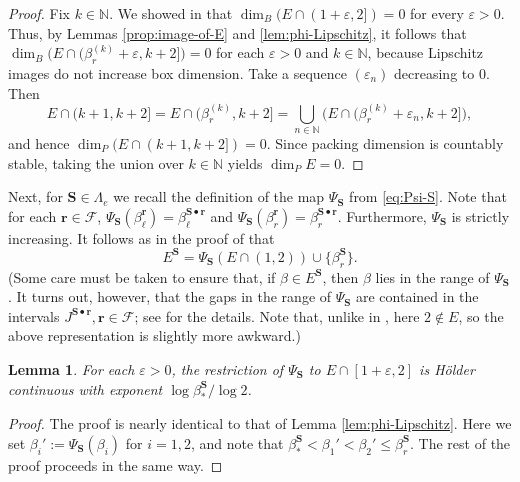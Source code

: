 \documentclass[12pt]{amsart}
\newtheorem{lemma}[theorem]{Lemma}
\theoremstyle{definition}
\theoremstyle{remark}
\numberwithin{equation}{section}
\newcommand{\N}{\ensuremath{\mathbb{N}}}
\newcommand{\cF}{\mathcal{F}}
\newcommand{\cs}{ {\mathbf{S}}}
\renewcommand{\r}{ {\mathbf{r}}}
\newcommand{\ep}{\varepsilon}
\newcommand{\al}{\alpha}
\newcommand{\La}{\Lambda}
\begin{document}
{\begin{proof}
Fix $k\in\N$. We showed in \cite{Allaart-Kong-2021} that $\dim_B(E\cap(1+\ep,2])=0$ for every $\ep>0$. Thus, by Lemmas \ref{prop:image-of-E} and \ref{lem:phi-Lipschitz}, it follows that $\dim_B\big(E\cap(\beta_r^{(k)}+\ep,k+2]\big)=0$ for each $\ep>0$ and $k\in\N$, because Lipschitz images do not increase box dimension. Take a sequence $(\ep_n)$ decreasing to $0$. Then 
\[
E\cap(k+1,k+2]=E\cap(\beta_r^{(k)},k+2]=\bigcup_{n\in\N} \big(E\cap(\beta_r^{(k)}+\ep_n,k+2]\big),
\]
and hence $\dim_P(E\cap(k+1,k+2])=0$. Since packing dimension is countably stable, taking the union over $k\in\N$ yields $\dim_P E=0$.
\end{proof}

Next, for $\cs\in\La_e$ we recall the definition of the map $\Psi_\cs$ from \eqref{eq:Psi-S}.
Note that for each $\r\in\cF$, $\Psi_\cs(\beta_\ell^\r)=\beta_\ell^{\cs\bullet\r}$ and $\Psi_\cs(\beta_r^\r)=\beta_r^{\cs\bullet\r}$. Furthermore, $\Psi_\cs$ is strictly increasing. It follows as in the proof of \cite[Proposition 5.4]{Allaart-Kong-2021} that
\begin{equation} \label{eq:E-transformation}
E^\cs=\Psi_\cs(E\cap(1,2))\cup\{\beta_r^\cs\}.
\end{equation}
(Some care must be taken to ensure that, if $\beta\in E^\cs$, then $\beta$ lies in the range of $\Psi_\cs$. It turns out, however, that the gaps in the range of $\Psi_\cs$ are contained in the intervals $J^{\cs\bullet\r}, \r\in\cF$; see \cite{Allaart-Kong-2021} for the details. Note that, unlike in \cite{Allaart-Kong-2021}, here $2\not\in E$, so the above representation is slightly more awkward.)

\begin{lemma} \label{lem:Psi_S-Holder}
For each $\ep>0$, the restriction of $\Psi_\cs$ to $E\cap[1+\ep,2]$ is H\"older continuous with exponent $\log\beta_*^\cs/\log 2$.
\end{lemma}

\begin{proof}
The proof is nearly identical to that of Lemma \ref{lem:phi-Lipschitz}. Here we set $\beta_i':=\Psi_\cs(\beta_i)$ for $i=1,2$, and note that $\beta_*^\cs<\beta_1'<\beta_2'\leq\beta_r^\cs$. The rest of the proof proceeds in the same way.
\end{proof}

}
\end{document}
